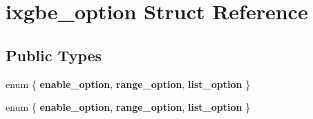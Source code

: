 \hypertarget{structixgbe__option}{
\section{ixgbe\_\-option Struct Reference}
\label{structixgbe__option}
}
\subsection*{Public Types}
\begin{DoxyCompactItemize}
\item 
enum \{ {\bfseries enable\_\-option}, 
{\bfseries range\_\-option}, 
{\bfseries list\_\-option}
 \}
\item 
enum \{ {\bfseries enable\_\-option}, 
{\bfseries range\_\-option}, 
{\bfseries list\_\-option}
 \}
\end{DoxyCompactItemize}
